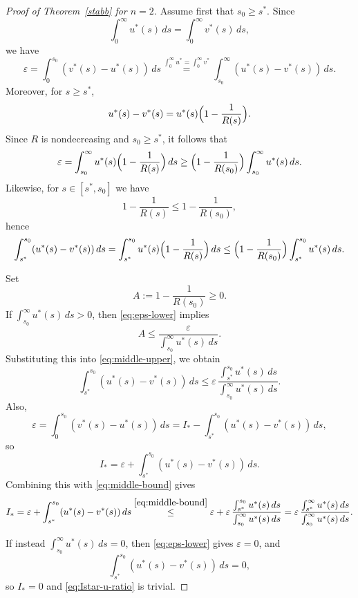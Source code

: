 \documentclass[a4paper,10pt]{amsart}
\begin{document}
\begin{proof}[Proof of Theorem~\ref{stabb} for $n=2$]
Assume first that $s_0\ge s^*$. Since
\[
\int_0^\infty u^*(s)\,ds=\int_0^\infty v^*(s)\,ds,
\]
we have
\[
\varepsilon
=
\int_0^{s_0}(v^*(s)-u^*(s))\,ds
\stackrel{\int_0^\infty u^*=\int_0^\infty v^*}{=}
\int_{s_0}^{\infty}(u^*(s)-v^*(s))\,ds.
\]
Moreover, for $s\ge s^*$,
\[
u^*(s)-v^*(s)
=
u^*(s)\Bigl(1-\frac{1}{R(s)}\Bigr).
\]
Since $R$ is nondecreasing and $s_0\ge s^*$, it follows that
\begin{equation}\label{eq:eps-lower}
\varepsilon
=
\int_{s_0}^{\infty}u^*(s)\Bigl(1-\frac1{R(s)}\Bigr)\,ds
\ge
\Bigl(1-\frac1{R(s_0)}\Bigr)\int_{s_0}^{\infty}u^*(s)\,ds.
\end{equation}
Likewise, for $s\in[s^*,s_0]$ we have
\[
1-\frac1{R(s)}\le 1-\frac1{R(s_0)},
\]
hence
\begin{equation}\label{eq:middle-upper}
\int_{s^*}^{s_0}(u^*(s)-v^*(s))\,ds
=
\int_{s^*}^{s_0}u^*(s)\Bigl(1-\frac1{R(s)}\Bigr)\,ds
\le
\Bigl(1-\frac1{R(s_0)}\Bigr)\int_{s^*}^{s_0}u^*(s)\,ds.
\end{equation}

Set
\[
A:=1-\frac1{R(s_0)}\ge0.
\]
If $\int_{s_0}^{\infty}u^*(s)\,ds>0$, then \eqref{eq:eps-lower} implies
\[
A\le
\frac{\varepsilon}{\int_{s_0}^{\infty}u^*(s)\,ds}.
\]
Substituting this into \eqref{eq:middle-upper}, we obtain
\begin{equation}\label{eq:middle-bound}
\int_{s^*}^{s_0}(u^*(s)-v^*(s))\,ds
\le
\varepsilon\,
\frac{\int_{s^*}^{s_0}u^*(s)\,ds}{\int_{s_0}^{\infty}u^*(s)\,ds}.
\end{equation}
Also,
\[
\varepsilon
=
\int_0^{s_0}(v^*(s)-u^*(s))\,ds
=
I_*-\int_{s^*}^{s_0}(u^*(s)-v^*(s))\,ds,
\]
so
\[
I_*=\varepsilon+\int_{s^*}^{s_0}(u^*(s)-v^*(s))\,ds.
\]
Combining this with \eqref{eq:middle-bound} gives
\begin{equation}\label{eq:Istar-u-ratio}
I_*
=
\varepsilon+\int_{s^*}^{s_0}(u^*(s)-v^*(s))\,ds
\stackrel{\eqref{eq:middle-bound}}{\le}
\varepsilon+\varepsilon\,
\frac{\int_{s^*}^{s_0}u^*(s)\,ds}{\int_{s_0}^{\infty}u^*(s)\,ds}
=
\varepsilon\,
\frac{\int_{s^*}^{\infty}u^*(s)\,ds}{\int_{s_0}^{\infty}u^*(s)\,ds}.
\end{equation}

If instead $\int_{s_0}^{\infty}u^*(s)\,ds=0$, then \eqref{eq:eps-lower} gives $\varepsilon=0$, and
\[
\int_{s^*}^{s_0}(u^*(s)-v^*(s))\,ds=0,
\]
so $I_*=0$ and \eqref{eq:Istar-u-ratio} is trivial.


\end{proof}
\end{document}
